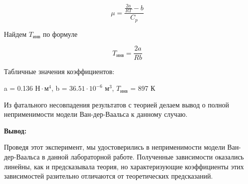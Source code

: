 \begin{equation}
\mu = \frac{\frac{2a}{RT} - b}{C_p}
\end{equation}

Найдем $T_{инв}$ по формуле

\begin{equation}
T_{инв} = \frac{2a}{Rb}
\end{equation}

\begin{center}
\begin{table}[h!]
\centering
{}
\end{table}
\end{center}

Табличные значения коэффициентов:\\
\begin{center}
a = 0.136 $Н \cdot м^4$, b = $36.51^{-6}$ $м^3$, $T_{инв}$ = 897 К
\end{center}

Из фатального несовпадения результатов с теорией делаем вывод о полной неприменимости модели Ван-дер-Ваальса к данному случаю.\\

\bigskip

\textbf{Вывод:} 

Проведя этот эксперимент, мы удостоверились в неприменимости модели Ван-дер-Ваальса в данной лабораторной работе. Полученные зависимости оказались линейны, как и предсказывала теория, но характеризующие коэффициенты этих зависимостей разительно отличаются от теоретических предсказаний.



